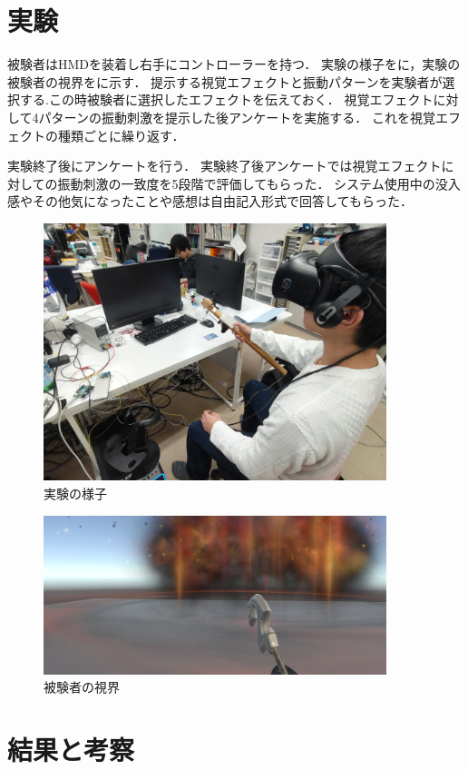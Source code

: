 \section{実験}
被験者はHMDを装着し右手にコントローラーを持つ．
実験の様子をに，実験の被験者の視界をに示す．
提示する視覚エフェクトと振動パターンを実験者が選択する.この時被験者に選択したエフェクトを伝えておく．
視覚エフェクトに対して4パターンの振動刺激を提示した後アンケートを実施する．
これを視覚エフェクトの種類ごとに繰り返す．


実験終了後にアンケートを行う．
実験終了後アンケートでは視覚エフェクトに対しての振動刺激の一致度を5段階で評価してもらった．
システム使用中の没入感やその他気になったことや感想は自由記入形式で回答してもらった．
\begin{figure}[t]
\centering
\includegraphics[clip,width=10cm]{./fig/jikken.png}
\caption{実験の様子}\label{jikken}
\end{figure}
\begin{figure}[b]
\centering
\includegraphics[clip,width=10cm]{./fig/unity.png}
\caption{被験者の視界}\label{first}
\end{figure}

\newpage

\section{結果と考察}
